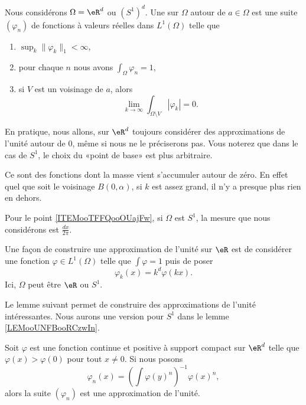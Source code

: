 \begin{definition}       \label{DEFooEFGNooOREmBb}
	Nous considérons \( \Omega=\eR^d\) ou \( (S^1)^d\). Une  sur \( \Omega\) autour de \( a\in \Omega\) est une suite \( (\varphi_n)\) de fonctions à valeurs réelles dans \( L^1(\Omega)\) telle que
	\begin{enumerate}
		\item
		      \( \sup_k \| \varphi_k \|_1 <\infty\),
		\item   \label{ITEMooGVRQooHDbrcf}
		      pour chaque \( n\) nous avons \( \int_{\Omega}\varphi_n=1\),
		\item
		      si \( V\) est un voisinage de \( a\), alors
		      \begin{equation}
			      \lim_{k\to \infty} \int_{\Omega\setminus V}| \varphi_k |=0.
		      \end{equation}
	\end{enumerate}
	En pratique, nous allons, sur \( \eR^d\) toujours considérer des approximations de l'unité autour de \( 0\), même si nous ne le préciserons pas. Vous noterez que dans le cas de \( S^1\), le choix du «point de base» est plus arbitraire.
\end{definition}
Ce sont des fonctions dont la masse vient s'accumuler autour de zéro. En effet quel que soit le voisinage \( B(0,\alpha)\), si \( k\) est assez grand, il n'y a presque plus rien en dehors.

Pour le point \eqref{ITEMooTFFQooOUajFw}, si \( \Omega\) est \( S^1\), la mesure que nous considérons est \( \frac{ dx }{ 2\pi }\).


\begin{example}
	Une façon de construire une approximation de l'unité sur \( \eR\) est de considérer une fonction \( \varphi\in L^1(\Omega)\) telle que \( \int\varphi=1\) puis de poser
	\begin{equation}
		\varphi_k(x)=k^d\varphi(kx).
	\end{equation}
	Ici, \( \Omega\) peut être \( \eR\) ou \( S^1\).
\end{example}

Le lemme suivant permet de construire des approximations de l'unité intéressantes. Nous aurons une version pour \( S^1\) dans le lemme \ref{LEMooUNFBooRCzwIn}.
\begin{lemma}   \label{LemCNjIYhv}
	Soit \( \varphi\) est une fonction continue et positive à support compact sur \( \eR^d\) telle que \( \varphi(x)>\varphi(0)\) pour tout \( x\neq 0\). Si nous posons
	\begin{equation}
		\varphi_n(x)=\left( \int\varphi(y)^n \right)^{-1}\varphi(x)^n,
	\end{equation}
	alors la suite \( (\varphi_n)\) est une approximation de l'unité.
\end{lemma}

